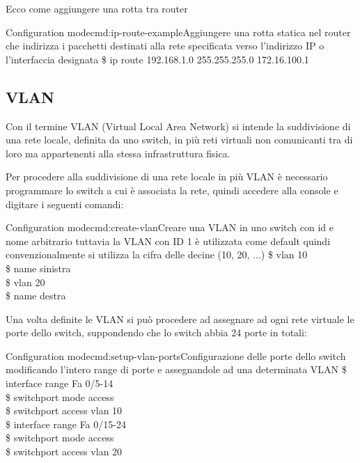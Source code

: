 Ecco come aggiungere una rotta tra router

\begin{cmds}[Router]{Configuration mode}{cmd:ip-route-example}{Aggiungere una rotta statica nel router che indirizza i pacchetti destinati alla \textcolor{Highlight1}{rete specificata} verso l'\textcolor{Highlight2}{indirizzo IP o l'interfaccia} designata }
    \$ ip route \textcolor{Highlight1}{192.168.1.0 255.255.255.0} \textcolor{Highlight2}{172.16.100.1}
\end{cmds}

\subsection{VLAN}
Con il termine VLAN (Virtual Local Area Network) si intende la suddivisione di una rete locale, definita da uno switch, in più reti virtuali non comunicanti tra di loro ma appartenenti alla stessa infrastruttura fisica.

Per procedere alla suddivisione di una rete locale in più VLAN è necessario programmare lo switch a cui è associata la rete, quindi accedere alla console e digitare i seguenti comandi:

\begin{cmds}[Switch]{Configuration mode}{cmd:create-vlan}{Creare una VLAN in uno switch con \textcolor{Highlight1}{id} e \textcolor{Highlight2}{nome} arbitrario tuttavia la VLAN con ID 1 è utilizzata come default quindi convenzionalmente si utilizza la cifra delle decine (10, 20, ...)}
    \$ vlan \textcolor{Highlight1}{10}\\
    \$ name \textcolor{Highlight2}{sinistra}\\
    \$ vlan \textcolor{Highlight1}{20}\\
    \$ name \textcolor{Highlight2}{destra}
\end{cmds}

Una volta definite le VLAN si può procedere ad assegnare ad ogni rete virtuale le porte dello switch, suppondendo che lo switch abbia 24 porte in totali:

\begin{cmds}{Configuration mode}{cmd:setup-vlan-ports}{Configurazione delle porte dello switch modificando l'intero \textcolor{Highlight1}{range} di porte e assegnandole ad una \textcolor{Highlight2}{determinata VLAN}}
    \$ interface range \textcolor{Highlight1}{Fa 0/5-14}\\
    \$ switchport mode access\\
    \$ switchport access \textcolor{Highlight2}{vlan 10}\\
    \$ interface range \textcolor{Highlight1}{Fa 0/15-24}\\
    \$ switchport mode access\\
    \$ switchport access \textcolor{Highlight2}{vlan 20}
\end{cmds}

